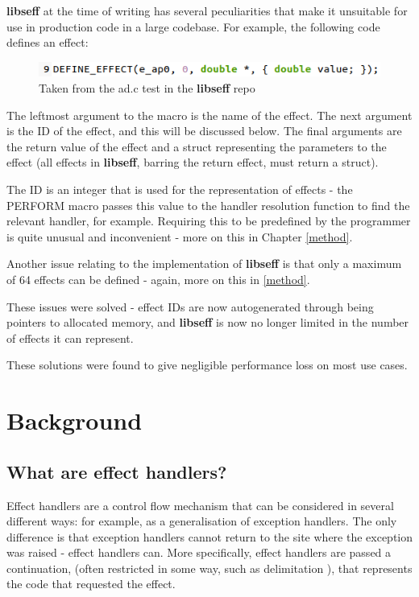 \documentclass[logo,bsc,singlespacing,parskip,online]{infthesis}
\begin{document}
\textbf{libseff} at the time of writing has several peculiarities that make it unsuitable for use in production code in a large codebase. For example, the following code defines an effect: 
\begin{figure}[h]
    \centering
    \includegraphics[width=0.9\linewidth]{eff_def.png}
    \caption{Taken from the ad.c test in the \textbf{libseff} repo}
\end{figure}

The leftmost argument to the macro is the name of the effect. The next argument is the ID of the effect, and this will be discussed below. The final arguments are the return value of the effect and a struct representing the parameters to the effect (all effects in \textbf{libseff}, barring the return effect, must return a struct).

The ID is an integer that is used for the representation of effects - the PERFORM macro passes this value to the handler resolution function to find the relevant handler, for example. Requiring this to be predefined by the programmer is quite unusual and inconvenient - more on this in Chapter \ref{method}.

Another issue relating to the implementation of \textbf{libseff} is that only a maximum of 64 effects can be defined - again, more on this in \ref{method}.

These issues were solved - effect IDs are now autogenerated through being pointers to allocated memory, and \textbf{libseff} is now no longer limited in the number of effects it can represent.

These solutions were found to give negligible performance loss on most use cases.





\chapter{Background} \label{background}

\section{What are effect handlers?}
Effect handlers are a control flow mechanism that can be considered in several different ways: for example, as a generalisation of exception handlers. \citep{sep-log} The only difference is that exception handlers cannot return to the site where the exception was raised - effect handlers can. More specifically, effect handlers are passed a continuation, (often restricted in some way, such as delimitation \citep{old-paper}), that represents the code that requested the effect.
\end{document}
